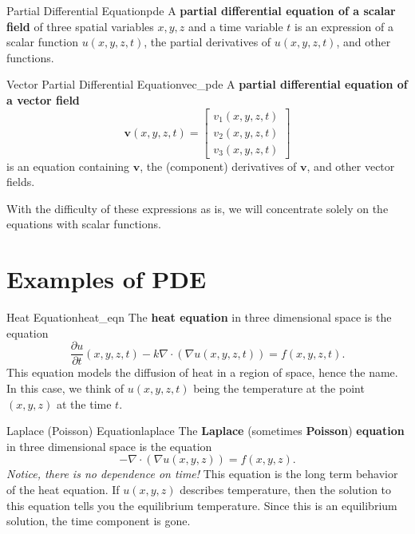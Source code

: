         \begin{df}{Partial Differential Equation}{pde}
        A \textbf{partial differential equation of a scalar field} of three spatial variables $x,y,z$ and a time variable $t$ is an expression of a scalar function $u(x,y,z,t)$, the partial derivatives of $u(x,y,z,t)$, and other functions.
        \end{df}
        
        \begin{df}{Vector Partial Differential Equation}{vec_pde}
        A \textbf{partial differential equation of a vector field}
        \[
        \mathbf{v}(x,y,z,t) = \begin{bmatrix} v_1(x,y,z,t) \\ v_2(x,y,z,t) \\ v_3(x,y,z,t) \end{bmatrix}
        \]
        is an equation containing $\mathbf{v}$, the (component) derivatives of $\mathbf{v}$, and other vector fields.
        \end{df}
        
        With the difficulty of these expressions as is, we will concentrate solely on the equations with scalar functions.
    
        \section{Examples of PDE}
        
        \begin{ex}{Heat Equation}{heat_eqn}
        The \textbf{heat equation} in three dimensional space is the equation
        \[
        \frac{\partial u}{\partial t}(x,y,z,t) -k\nabla \cdot (\nabla u(x,y,z,t)) = f(x,y,z,t).
        \]
        This equation models the diffusion of heat in a region of space, hence the name.  In this case, we think of $u(x,y,z,t)$ being the temperature at the point $(x,y,z)$ at the time $t$.
        \end{ex}
        
        \begin{ex}{Laplace (Poisson) Equation}{laplace}
        The \textbf{Laplace} (sometimes \textbf{Poisson}) \textbf{equation} in three dimensional space is the equation
        \[
        -\nabla \cdot (\nabla u(x,y,z))=f(x,y,z).
        \]
        \emph{Notice, there is no dependence on time!} This equation is the long term behavior of the heat equation.  If $u(x,y,z)$ describes temperature, then the solution to this equation tells you the equilibrium temperature. Since this is an equilibrium solution, the time component is gone.
        \end{ex}
        
